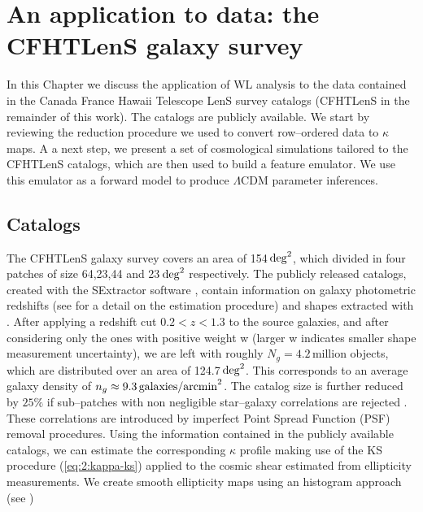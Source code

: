 
\chapter{An application to data: the CFHTLenS galaxy survey}
\lhead[\fancyplain{}{\thepage}]{\fancyplain{}{\rightmark}}
 \thispagestyle{plain}
\setlength{\parindent}{10mm}

\label{chp:6}

In this Chapter we discuss the application of WL analysis to the data contained in the Canada France Hawaii Telescope LenS survey catalogs \citep{cfht1,cfht2,CFHTKilbinger} (CFHTLenS in the remainder of this work). The catalogs are publicly available. We start by reviewing the reduction procedure we used to convert row--ordered data to $\kappa$ maps. A a next step, we present a set of cosmological simulations tailored to the CFHTLenS catalogs, which are then used to build a feature emulator. We use this emulator as a forward model to produce $\Lambda$CDM parameter inferences.   

\section{Catalogs}
The CFHTLenS galaxy survey covers an area of 154\,${\rm deg}^2$, which divided in four patches of size 64,23,44 and 23\,${\rm deg}^2$ respectively. The publicly released catalogs, created with the SExtractor software \citep{SExtractor}, contain information on galaxy photometric redshifts (see \citep{cfhtPhoto} for a detail on the estimation procedure) and shapes extracted with  \citep{cfht1,cfht2}. After applying a redshift cut $0.2<z<1.3$ to the source galaxies, and after considering only the ones with positive weight w (larger w indicates smaller shape measurement uncertainty), we are left with roughly $N_g=4.2$\,million objects, which are distributed over an area of 124.7\,${\rm deg}^2$. This corresponds to an average galaxy density of $n_g\approx 9.3\,{\rm galaxies/arcmin}^2$. The catalog size is further reduced by $25\%$ if sub--patches with non negligible star--galaxy correlations are rejected \citep{CFHTFu}. These correlations are introduced by imperfect Point Spread Function (PSF) removal procedures. Using the information contained in the publicly available catalogs, we can estimate the corresponding $\kappa$ profile making use of the KS procedure (\ref{eq:2:kappa-ks}) applied to the cosmic shear estimated from ellipticity measurements. We create smooth ellipticity maps using an histogram approach (see \citep{PetriCFHTMink,PetriCFHTPeaks})

